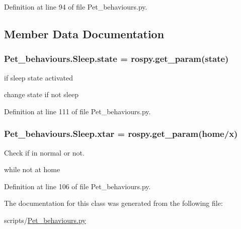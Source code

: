 Definition at line 94 of file Pet\+\_\+behaviours.\+py.



\subsection{Member Data Documentation}
\subsubsection[{\texorpdfstring{state}{state}}]{\setlength{\rightskip}{0pt plus 5cm}Pet\+\_\+behaviours.\+Sleep.\+state = rospy.\+get\+\_\+param(\textquotesingle{}state\textquotesingle{})\hspace{0.3cm}{\ttfamily [static]}}\hypertarget{classPet__behaviours_1_1Sleep_a896626409cc2d477e99165f69de520de}{}\label{classPet__behaviours_1_1Sleep_a896626409cc2d477e99165f69de520de}


if sleep state activated 

change state if not sleep 

Definition at line 111 of file Pet\+\_\+behaviours.\+py.

\subsubsection[{\texorpdfstring{xtar}{xtar}}]{\setlength{\rightskip}{0pt plus 5cm}Pet\+\_\+behaviours.\+Sleep.\+xtar = rospy.\+get\+\_\+param(\textquotesingle{}home/x\textquotesingle{})\hspace{0.3cm}{\ttfamily [static]}}\hypertarget{classPet__behaviours_1_1Sleep_a643e30c580a0274a40c28847a1c9e445}{}\label{classPet__behaviours_1_1Sleep_a643e30c580a0274a40c28847a1c9e445}


Check if in normal or not. 

while not at home 

Definition at line 106 of file Pet\+\_\+behaviours.\+py.



The documentation for this class was generated from the following file\+:\begin{DoxyCompactItemize}
\item 
scripts/\hyperlink{Pet__behaviours_8py}{Pet\+\_\+behaviours.\+py}\end{DoxyCompactItemize}
